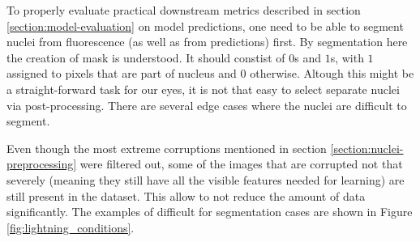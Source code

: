
To properly evaluate practical downstream metrics described in section \ref{section:model-evaluation} on model predictions, one need to be able to segment nuclei from fluorescence (as well as from predictions) first. By segmentation here the creation of mask is understood. It should constist of $0$s and $1$s, with $1$ assigned to pixels that are part of nucleus and $0$ otherwise. Altough this might be a straight-forward task for our eyes, it is not that easy to select separate nuclei via post-processing. There are several edge cases where the nuclei are difficult to segment.

Even though the most extreme corruptions mentioned in section \ref{section:nuclei-preprocessing} were filtered out, some of the images that are corrupted not that severely (meaning they still have all the visible features needed for learning) are still present in the dataset. This allow to not reduce the amount of data  significantly. The examples of difficult for segmentation cases are shown in Figure \ref{fig:lightning_conditions}.
